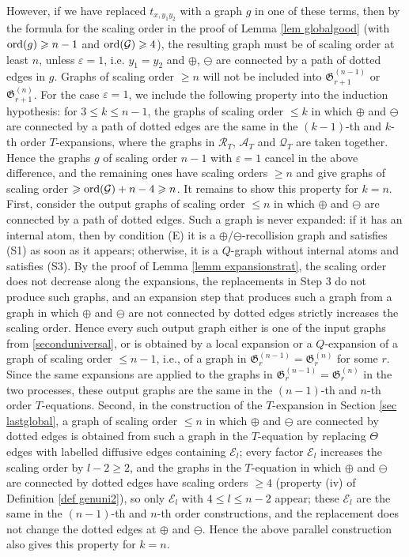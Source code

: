 \documentclass{article}
\newcommand{\1}{\mathds{1}}
\numberwithin{equation}{section}
\newcommand{\ord}{{\rm{ord}}}
\renewcommand{\cal}{\mathcal}
\renewcommand{\epsilon}{\varepsilon}
\renewcommand{\leq}{\leqslant}
\renewcommand{\geq}{\geqslant}
\renewcommand{\le}{\leq}
\renewcommand{\ge}{\geq}
\newcommand{\dashed}{\text{diffusive}}
\theoremstyle{plain} %
\theoremstyle{remark}
\newcommand{\Sele}{{\mathcal E}}
\newcommand{\incomp}{{\text{$T$-equation}}}
\newcommand{\PT}{\mathcal R_T}
\newcommand{\QT}{\mathcal Q_T}
\newcommand{\AT}{\mathcal A_T}
\begin{document}
\begin{itemize}
However, if we have replaced $t_{x,y_1y_2}$ with a graph $g$ in one of these terms, then by the formula for the scaling order in the proof of Lemma \ref{lem globalgood} (with $\ord(g)\ge n-1$ and $\ord(\cal G)\ge 4$), the resulting graph must be of scaling order at least $n$, unless $\epsilon=1$, i.e. $y_1=y_2$ and $\oplus$, $\ominus$ are connected by a path of dotted edges in $g$. Graphs of scaling order $\ge n$ will not be included into $\mathfrak G^{(n-1)}_{r+1}$ or $\mathfrak G^{(n)}_{r+1}$. For the case $\epsilon=1$, we include the following property into the induction hypothesis: for $3\le k\le n-1$, the graphs of scaling order $\le k$ in which $\oplus$ and $\ominus$ are connected by a path of dotted edges are the same in the $(k-1)$-th and $k$-th order $T$-expansions, where the graphs in $\PT$, $\AT$ and $\QT$ are taken together. Hence the graphs $g$ of scaling order $n-1$ with $\epsilon=1$ cancel in the above difference, and the remaining ones have scaling orders $\ge n$ and give graphs of scaling order $\ge \ord(\cal G)+n-4\ge n$. It remains to show this property for $k=n$. First, consider the output graphs of scaling order $\le n$ in which $\oplus$ and $\ominus$ are connected by a path of dotted edges. Such a graph is never expanded: if it has an internal atom, then by condition (E) it is a $\oplus$/$\ominus$-recollision graph and satisfies (S1) as soon as it appears; otherwise, it is a $Q$-graph without internal atoms and satisfies (S3). By the proof of Lemma \ref{lemm expansionstrat}, the scaling order does not decrease along the expansions, the replacements in Step 3 do not produce such graphs, and an expansion step that produces such a graph from a graph in which $\oplus$ and $\ominus$ are not connected by dotted edges strictly increases the scaling order. Hence every such output graph either is one of the input graphs from \eqref{seconduniversal}, or is obtained by a local expansion or a $Q$-expansion of a graph of scaling order $\le n-1$, i.e., of a graph in $\mathfrak G^{(n-1)}_r=\mathfrak G^{(n)}_r$ for some $r$. Since the same expansions are applied to the graphs in $\mathfrak G^{(n-1)}_r=\mathfrak G^{(n)}_r$ in the two processes, these output graphs are the same in the $(n-1)$-th and $n$-th order $\incomp$s. Second, in the construction of the $T$-expansion in Section \ref{sec lastglobal}, a graph of scaling order $\le n$ in which $\oplus$ and $\ominus$ are connected by dotted edges is obtained from such a graph in the $\incomp$ by replacing $\Theta$ edges with labelled $\dashed$ edges containing $\Sele_l$; every factor $\Sele_l$ increases the scaling order by $l-2\ge 2$, and the graphs in the $\incomp$ in which $\oplus$ and $\ominus$ are connected by dotted edges have scaling orders $\ge 4$ (property (iv) of Definition \ref{def genuni2}), so only $\Sele_l$ with $4\le l\le n-2$ appear; these $\Sele_l$ are the same in the $(n-1)$-th and $n$-th order constructions, and the replacement does not change the dotted edges at $\oplus$ and $\ominus$. Hence the above parallel construction also gives this property for $k=n$.


\end{itemize}
\end{document}
